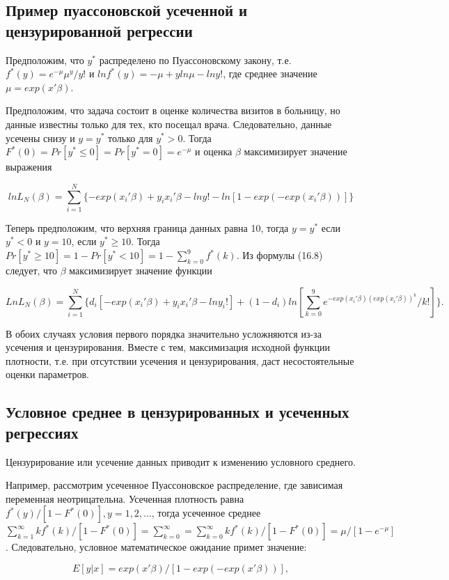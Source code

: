 \subsection{Пример пуассоновской усеченной и цензурированной регрессии}


Предположим, что $y^{*}$ распределено по Пуассоновскому закону, т.е. $f^{*}(y)=e^{-\mu}\mu^{y}/y!$ и $ln{f^{*}(y)}=-\mu+yln{\mu}-ln{y!}$, где среднее значение $\mu=exp(x'\beta)$.

Предположим, что задача состоит в оценке количества визитов в больницу, но данные известны только для тех, кто посещал врача. Следовательно, данные усечены снизу и $y=y^{*}$ только для $y^{*}>0$. Тогда $F^{*}(0)=Pr[y^{*}{\leq}0]=Pr[y^{*}=0]=e^{-\mu}$ и оценка $\beta$ максимизирует значение выражения

\[
ln{L_N(\beta)}=\sum_{i=1}^N{\lbrace-exp(x_i'\beta)+y_ix_i'\beta-ln{y!}-ln[1-exp(-exp(x_i'\beta))]\rbrace}
\]


Теперь предположим, что верхняя граница данных равна 10, тогда $y=y^{*}$ если $y^{*}<0$ и $y=10$, если $y^{*}{\geq}10$. Тогда $Pr[y^{*}{\geq}10]=1-Pr[y^{*}<10]=1-\sum_{k=0}^9 f^{*}(k)$. Из формулы (16.8) следует, что $\beta$ максимизирует значение функции


\[
Ln{L_N(\beta)}=\sum_{i=1}^N \lbrace d_i[-exp(x_i'\beta)+y_ix_i'\beta-ln{y_i}!]+(1-d_i)ln{\left[\sum_{k=0}^9 e^{-exp(x_i'\beta)(exp(x_i'\beta))^{k}}/k!\right]}\rbrace.
\]


В обоих случаях условия первого порядка значительно усложняются из-за усечения и цензурирования. Вместе с тем, максимизация исходной функции плотности, т.е. при отсутствии усечения и цензурирования, даст несостоятельные оценки параметров.

\subsection{Условное среднее в цензурированных и усеченных регрессиях}

Цензурирование или усечение данных приводит к изменению условного среднего.

Например, рассмотрим усеченное Пуассоновское распределение, где зависимая переменная неотрицательна. Усеченная плотность равна $f^{*}(y)/[1-F^{*}(0)], y=1,2,...$, тогда усеченное среднее $\sum^{\infty}_{k=1}kf^{*}(k)/[1-F^{*}(0)]=\sum^{\infty}_{k=0}=\sum^{\infty}_{k=0}kf^{*}(k)/[1-F^{*}(0)]=\mu/[1-e^{-\mu}]$. Следовательно, условное математическое ожидание примет значение:


\[
E[y|x]=exp(x'\beta)/[1-exp(-exp(x'\beta))],
\]

